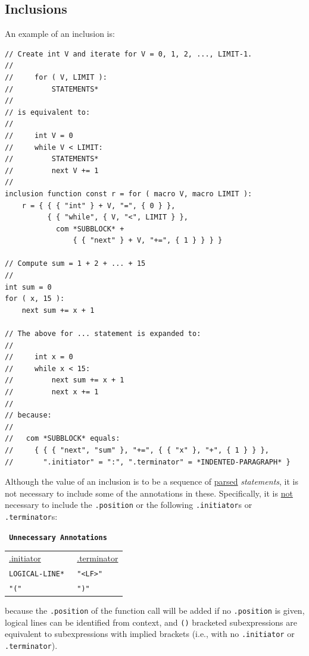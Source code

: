 \documentclass[12pt]{article}
\newenvironment{indpar}[1][0.3in]%
	{\begin{list}{}%
		     {\setlength{\itemsep}{0in}%
		      \setlength{\topsep}{0in}%
		      \setlength{\parsep}{1ex}%
		      \setlength{\labelwidth}{#1}%
		      \setlength{\leftmargin}{#1}%
		      \addtolength{\leftmargin}{\labelsep}}%
	 \item}%
	{\end{list}}
\begin{document}
\subsection{Inclusions}
\label{INCLUSIONS}

An example of an inclusion is:
\begin{indpar}[1em]\begin{verbatim}
// Create int V and iterate for V = 0, 1, 2, ..., LIMIT-1.
//
//     for ( V, LIMIT ):
//         STATEMENTS*
//
// is equivalent to:
//
//     int V = 0
//     while V < LIMIT:
//         STATEMENTS*
//         next V += 1
//
inclusion function const r = for ( macro V, macro LIMIT ):
    r = { { { "int" } + V, "=", { 0 } },
          { { "while", { V, "<", LIMIT } },
            com *SUBBLOCK* +
                { { "next" } + V, "+=", { 1 } } } }

// Compute sum = 1 + 2 + ... + 15
//
int sum = 0
for ( x, 15 ):
    next sum += x + 1

// The above for ... statement is expanded to:
//
//     int x = 0
//     while x < 15:
//         next sum += x + 1
//         next x += 1
//
// because:
//
//   com *SUBBLOCK* equals:
//     { { { "next", "sum" }, "+=", { { "x" }, "+", { 1 } } },
//       ".initiator" = ":", ".terminator" = *INDENTED-PARAGRAPH* }
\end{verbatim}\end{indpar}

Although the value of an inclusion is to be a sequence of
\underline{parsed} {\em statements}, it is not necessary to
include some of the annotations in these.
Specifically, it is \underline{not} necessary to
include the {\tt .position} or
the following {\tt .initiator}s or {\tt .terminator}s:

\begin{center} \tt
{\rm \bf Unnecessary Annotations}\label{UNNECESSARY-ANNOTATIONS}
\\[1ex]
\begin{tabular}{l@{~~~~~~~~~~}l}
\underline{.initiator} & \underline{.terminator}
\\[1ex]
\tt *LOGICAL-LINE* & \tt "<LF>" \\
\tt "(" & \tt ")" \\
\end{tabular}
\end{center}

because the {\tt .position} of the function call will be added
if no {\tt .position} is given,
logical lines can be identified from context, and
{\tt ()} bracketed subexpressions are equivalent to
subexpressions with implied brackets (i.e., with no
{\tt .initiator} or {\tt .terminator}).
\end{document}
